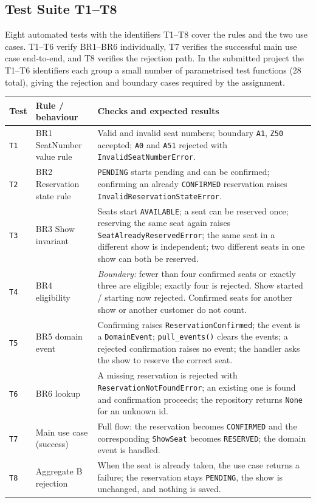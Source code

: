 \documentclass[11pt,a4paper]{article}
\newcommand{\code}[1]{\texttt{#1}}
\begin{document}
\subsection{Test Suite T1--T8}

Eight automated tests with the identifiers T1--T8 cover the rules and the two
use cases. T1--T6 verify BR1--BR6 individually, T7 verifies the successful main
use case end-to-end, and T8 verifies the rejection path. In the submitted
project the T1--T6 identifiers each group a small number of parametrised test
functions (28 total), giving the rejection and boundary cases required by the
assignment.

\begin{center}
  \scriptsize
  \begin{tabularx}{\textwidth}{@{}l l X@{}}
    \toprule
    \textbf{Test} & \textbf{Rule / behaviour} & \textbf{Checks and expected results} \\
    \midrule
    \code{T1} & BR1 SeatNumber value rule &
      Valid and invalid seat numbers; boundary \code{A1}, \code{Z50} accepted;
      \code{A0} and \code{A51} rejected with \code{InvalidSeatNumberError}. \\
    \code{T2} & BR2 Reservation state rule &
      \code{PENDING} starts pending and can be confirmed; confirming an already
      \code{CONFIRMED} reservation raises \code{InvalidReservationStateError}. \\
    \code{T3} & BR3 Show invariant &
      Seats start \code{AVAILABLE}; a seat can be reserved once; reserving the
      same seat again raises \code{SeatAlreadyReservedError}; the same seat in
      a different show is independent; two different seats in one show can both
      be reserved. \\
    \code{T4} & BR4 eligibility & 
      \emph{Boundary:} fewer than four confirmed seats or exactly three are
      eligible; exactly four is rejected. Show started / starting now rejected.
      Confirmed seats for another show or another customer do not count. \\
    \code{T5} & BR5 domain event &
      Confirming raises \code{ReservationConfirmed}; the event is a
      \code{DomainEvent}; \code{pull\_events()} clears the events; a rejected
      confirmation raises no event; the handler asks the show to reserve the
      correct seat. \\
    \code{T6} & BR6 lookup &
      A missing reservation is rejected with \code{ReservationNotFoundError}; an
      existing one is found and confirmation proceeds; the repository returns
      \code{None} for an unknown id. \\
    \code{T7} & Main use case (success) &
      Full flow: the reservation becomes \code{CONFIRMED} and the corresponding
      \code{ShowSeat} becomes \code{RESERVED}; the domain event is handled. \\
    \code{T8} & Aggregate B rejection &
      When the seat is already taken, the use case returns a failure; the
      reservation stays \code{PENDING}, the show is unchanged, and nothing is
      saved. \\
    \bottomrule
  \end{tabularx}
\end{center}
\end{document}
